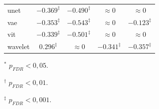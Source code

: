 \begin{table}[htbp]
\begin{threeparttable}
{\begin{tabular}{lcccc}
unet & $-0.369^{\ddagger}$ & $-0.490^{\ddagger}$ & $\approx 0$ & $\approx 0$ \\
vae & $-0.353^{\ddagger}$ & $-0.543^{\ddagger}$ & $\approx 0$ & $-0.123^{\ddagger}$ \\
vit & $-0.339^{\ddagger}$ & $-0.501^{\ddagger}$ & $\approx 0$ & $\approx 0$ \\
wavelet & $0.296^{\ddagger}$ & $\approx 0$ & $-0.341^{\ddagger}$ & $-0.357^{\ddagger}$ \\
\bottomrule
\end{tabular}
}
\begin{tablenotes}
\scriptsize
\item $^{*}$ $p_{FDR}<0{,}05$.
\item $^{\dagger}$ $p_{FDR}<0{,}01$.
\item $^{\ddagger}$ $p_{FDR}<0{,}001$.
\end{tablenotes}
\end{threeparttable}
\end{table}
